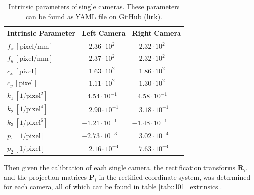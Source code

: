 \begin{table}
	\centering
	\caption{Intrinsic parameters of single cameras. These parameters can be found as YAML file on GitHub (\href{https://github.com/mhubii/nmpc_pattern_generator/tree/master/libs/io_module}{\underline{link}}).\label{tab::101_intrinsics}}
	\begin{tabular}{lll}
		Intrinsic Parameter & Left Camera & Right Camera\\
		\hline
		$f_x\,[\text{pixel}/\text{mm}]$ & $\quad2.36\cdot10^2$ & $\quad2.32\cdot10^2$ \\
		$f_y\,[\text{pixel}/\text{mm}]$ & $\quad2.37\cdot10^2$ & $\quad2.32\cdot10^2$ \\
		$c_x\,[\text{pixel}]$ & $\quad1.63\cdot10^2$ & $\quad1.86\cdot10^2$ \\
		$c_y\,[\text{pixel}]$ & $\quad1.11\cdot10^2$ & $\quad1.30\cdot10^2$ \\
		$k_1\,[1/\text{pixel}^2]$ & $-4.54\cdot10^{-1}$ & $-4.58\cdot10^{-1}$ \\
		$k_2\,[1/\text{pixel}^4]$ & $\quad2.90\cdot10^{-1}$  & $\quad3.18\cdot10^{-1}$  \\
		$k_3\,[1/\text{pixel}^6]$ & $-1.21\cdot10^{-1}$ & $-1.48\cdot10^{-1}$ \\
		$p_1\,[1/\text{pixel}]$ & $-2.73\cdot10^{-3}$ & $\quad3.02\cdot10^{-4}$  \\
		$p_2\,[1/\text{pixel}]$ & $\quad2.16\cdot10^{-4}$  & $\quad7.63\cdot10^{-4}$		
	\end{tabular}
\end{table}
Then given the calibration of each single camera, the rectification transforms $\bm{R}_i$, and the projection matrices $\bm{P}_i$ in the rectified coordinate system, was determined for each camera, all of which can be found in table \ref{tab::101_extrinsics}.
